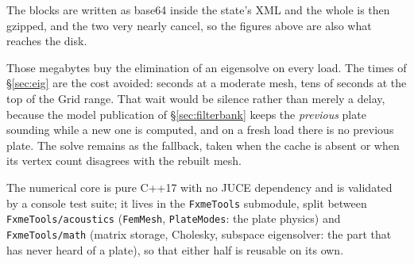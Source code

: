 \documentclass[11pt,a4paper]{article}
\newcommand{\code}[1]{\texttt{#1}}
\begin{document}
The blocks are written as base64 inside the state's XML and the whole is then
gzipped, and the two very nearly cancel, so the figures above are also what
reaches the disk.

Those megabytes buy the elimination of an eigensolve on every load. The times
of \S\ref{sec:eig} are the cost avoided: seconds at a moderate mesh, tens of
seconds at the top of the Grid range. That wait would be silence rather than
merely a delay, because the model publication of \S\ref{sec:filterbank} keeps
the \emph{previous} plate sounding while a new one is computed, and on a fresh
load there is no previous plate. The solve remains as the fallback, taken when
the cache is absent or when its vertex count disagrees with the rebuilt mesh.

The numerical core is pure C++17 with no JUCE dependency and is validated
by a console test suite; it lives in the \code{FxmeTools} submodule, split
between \code{FxmeTools/acoustics} (\code{FemMesh}, \code{PlateModes}: the
plate physics) and \code{FxmeTools/math} (matrix storage, Cholesky,
subspace eigensolver: the part that has never heard of a plate), so that
either half is reusable on its own.
\end{document}
